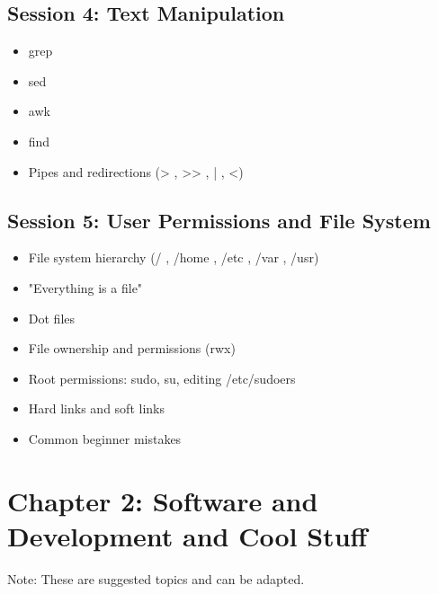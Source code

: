\documentclass[12pt]{article}
\begin{document}
\subsection*{Session 4: Text Manipulation}
\begin{itemize}
    \item grep
    \item sed
    \item awk
    \item find
    \item Pipes and redirections (> , >> , | , <)
\end{itemize}

\subsection*{Session 5: User Permissions and File System}
\begin{itemize}
    \item File system hierarchy (/ , /home , /etc , /var , /usr)
    \item "Everything is a file"
    \item Dot files
    \item File ownership and permissions (rwx)
    \item Root permissions: sudo, su, editing /etc/sudoers
    \item Hard links and soft links
    \item Common beginner mistakes
\end{itemize}

\section*{Chapter 2: Software and Development and Cool Stuff}

\begin{infobox}
Note: These are suggested topics and can be adapted.
\end{infobox}
\end{document}
